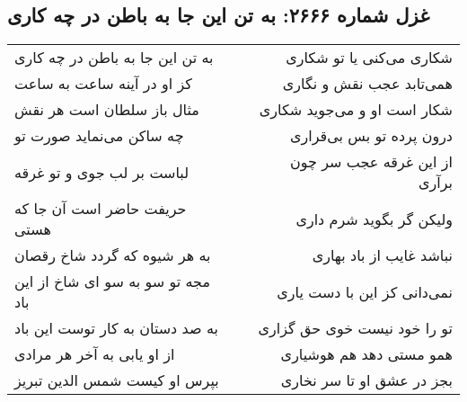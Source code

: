 \begin{center}
\section*{غزل شماره ۲۶۶۶: به تن این جا به باطن در چه کاری}
\label{sec:2666}
\begin{longtable}{l p{0.5cm} r}
به تن این جا به باطن در چه کاری
&&
شکاری می‌کنی یا تو شکاری
\\
کز او در آینه ساعت به ساعت
&&
همی‌تابد عجب نقش و نگاری
\\
مثال باز سلطان است هر نقش
&&
شکار است او و می‌جوید شکاری
\\
چه ساکن می‌نماید صورت تو
&&
درون پرده تو بس بی‌قراری
\\
لباست بر لب جوی و تو غرقه
&&
از این غرقه عجب سر چون برآری
\\
حریفت حاضر است آن جا که هستی
&&
ولیکن گر بگوید شرم داری
\\
به هر شیوه که گردد شاخ رقصان
&&
نباشد غایب از باد بهاری
\\
مجه تو سو به سو ای شاخ از این باد
&&
نمی‌دانی کز این با دست یاری
\\
به صد دستان به کار توست این باد
&&
تو را خود نیست خوی حق گزاری
\\
از او یابی به آخر هر مرادی
&&
همو مستی دهد هم هوشیاری
\\
بپرس او کیست شمس الدین تبریز
&&
بجز در عشق او تا سر نخاری
\\
\end{longtable}
\end{center}
